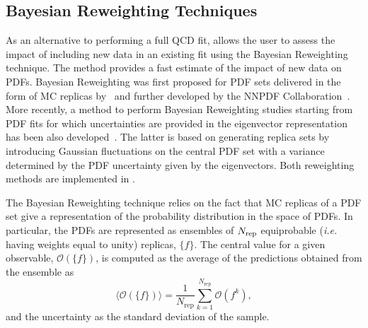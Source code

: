 \subsection{Bayesian Reweighting Techniques}

As an alternative to performing a full QCD fit, \fitter allows the user to assess the impact of including new
data in an existing fit using the Bayesian Reweighting technique. The method
provides a fast estimate of the impact of new data on PDFs. 
Bayesian Reweighting was first proposed for PDF sets delivered in the form of MC replicas by~\cite{Giele:1998gw} and further developed by the NNPDF Collaboration~\cite{Ball:2011gg,Ball:2010gb}. 
More recently, a method to perform Bayesian Reweighting studies starting from PDF fits for which uncertainties
are provided in the eigenvector representation has been also developed~\cite{Watt:2012tq}. The latter is 
based on generating replica sets by introducing Gaussian fluctuations on the central PDF set with a variance 
determined by the PDF uncertainty given by the eigenvectors. Both reweighting methods are implemented in \fitter.

The Bayesian Reweighting technique relies on the fact that MC replicas of a PDF set give 
a representation of the probability distribution in the space of PDFs. In particular, the PDFs are represented 
as ensembles of $N_{\rm rep}$ equiprobable ({\em i.e.} having weights equal to unity) replicas, $\{f\}$. 
The central value for a given observable, $\mathcal{O}(\{f\})$, is computed as the average of the 
predictions obtained from the ensemble as
\begin{equation}
\langle\mathcal{O}(\{f\})\rangle =  \frac{1}{N_{\mathrm{rep}}} \sum_{k=1}^{N_{\mathrm{rep}}} \mathcal{O}(f^{k}),
\end{equation}
and the uncertainty as the standard deviation of the sample.

